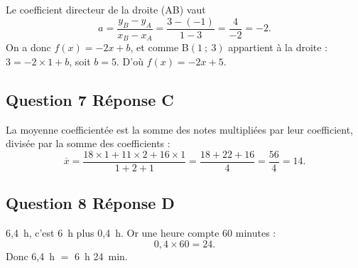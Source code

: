 \documentclass[10pt]{article}
\begin{document}
Le coefficient directeur de la droite (AB) vaut
\[a = \dfrac{y_B - y_A}{x_B - x_A} = \dfrac{3 - (-1)}{1 - 3} = \dfrac{4}{-2} = -2.\]
On a donc $f(x) = -2x + b$, et comme B$(1~;~3)$ appartient à la droite :
$3 = -2\times 1 + b$, soit $b = 5$. D'où $f(x) = -2x + 5$.

\subsection*{Question 7 \quad Réponse C}

La moyenne coefficientée est la somme des notes multipliées par leur coefficient, divisée par
la somme des coefficients :
\[\overline{x} = \dfrac{18\times 1 + 11\times 2 + 16\times 1}{1 + 2 + 1} = \dfrac{18 + 22 + 16}{4} = \dfrac{56}{4} = 14.\]

\subsection*{Question 8 \quad Réponse D}

6,4~h, c'est 6~h plus 0,4~h. Or une heure compte 60 minutes :
\[0,4 \times 60 = 24.\]
Donc 6,4~h $=$ 6~h 24~min.
\end{document}
